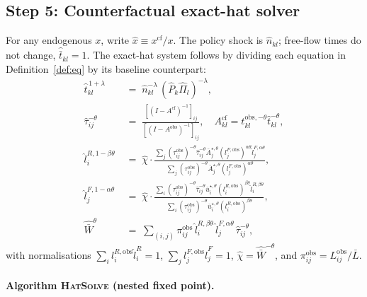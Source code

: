 \documentclass[12pt]{article}
\newcommand{\Lbar}{\bar L}
\newcommand{\Wbar}{\bar W}
\newcommand{\ubar}{\bar u}
\newcommand{\Abar}{\bar A}
\newcommand{\tbar}{\bar t}
\newcommand{\tkl}{t_{kl}}
\newcommand{\tijk}{\tau_{ij}}
\newcommand{\obs}{\mathrm{obs}}
\newcommand{\cf}{\mathrm{cf}}
\begin{document}
\subsection{Step 5: Counterfactual exact-hat solver}\label{ssec:hat}

For any endogenous $x$, write $\hat x\equiv x^{\cf}/x$.  The policy
shock is $\hat n_{kl}$; free-flow times do not change,
$\hat{\tbar}_{kl}=1$.  The exact-hat system follows by dividing each
equation in Definition~\ref{def:eq} by its baseline counterpart:
\begin{align}
  \hat\tkl^{\,1+\lambda}
  &\;=\;\hat n_{kl}^{-\lambda}\,(\hat P_k\hat\Pi_l)^{-\lambda},
  \label{eq:hat_tkl}\\
  \hat\tijk^{-\theta}
  &\;=\;
  \frac{[(I-A^{\cf})^{-1}]_{ij}}{[(I-A^{\obs})^{-1}]_{ij}},
  \quad A^{\cf}_{kl}=\tkl^{\obs,-\theta}\hat\tkl^{-\theta},
  \label{eq:hat_tau}\\
  \hat l_i^{R,1-\beta\theta}
  &\;=\;\hat\chi\cdot
    \frac{\sum_j (\tijk^{\obs})^{-\theta}\hat\tijk^{-\theta}
                  \Abar_j^{\star,\theta}(l_j^{F,\obs})^{\alpha\theta}
                  \hat l_j^{F,\alpha\theta}}
         {\sum_j (\tijk^{\obs})^{-\theta}\Abar_j^{\star,\theta}
                  (l_j^{F,\obs})^{\alpha\theta}},
  \label{eq:hat_lR}\\
  \hat l_j^{F,1-\alpha\theta}
  &\;=\;\hat\chi\cdot
    \frac{\sum_i (\tijk^{\obs})^{-\theta}\hat\tijk^{-\theta}
                  \ubar_i^{\star,\theta}(l_i^{R,\obs})^{\beta\theta}
                  \hat l_i^{R,\beta\theta}}
         {\sum_i (\tijk^{\obs})^{-\theta}\ubar_i^{\star,\theta}
                  (l_i^{R,\obs})^{\beta\theta}},
  \label{eq:hat_lF}\\
  \hat{\Wbar}^{\theta}
  &\;=\;\sum_{(i,j)}\pi_{ij}^{\obs}\,
        \hat l_i^{R,\beta\theta}\,\hat l_j^{F,\alpha\theta}\,
        \hat\tijk^{-\theta},
  \label{eq:hat_W}
\end{align}
with normalisations $\sum_i l_i^{R,\obs}\hat l_i^R=1$,
$\sum_j l_j^{F,\obs}\hat l_j^F=1$, $\hat\chi=\hat{\Wbar}^{-\theta}$,
and $\pi_{ij}^{\obs}=L_{ij}^{\obs}/\Lbar$.

\paragraph{Algorithm \textsc{HatSolve} (nested fixed point).}
\end{document}
